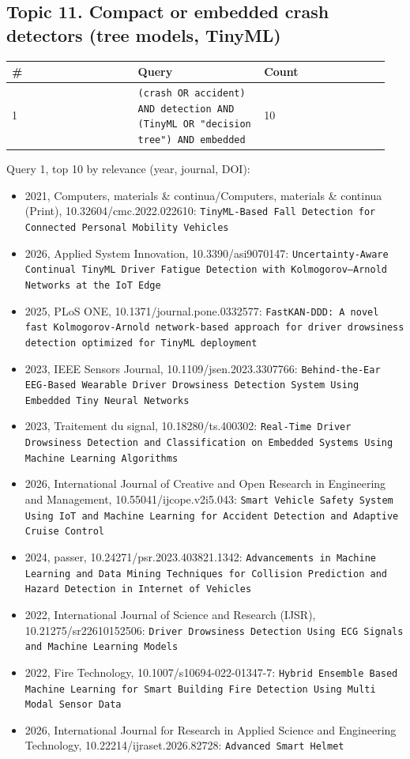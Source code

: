 \subsection*{Topic 11. Compact or embedded crash detectors (tree models, TinyML)}

{\scriptsize\raggedright
\begin{longtable}{p{0.317\linewidth}p{0.317\linewidth}p{0.317\linewidth}}
\toprule
\# & Query & Count \\
\midrule
\endhead
1 & \texttt{(crash OR accident) AND detection AND (TinyML OR "decision tree") AND embedded} & 10 \\
\bottomrule
\end{longtable}}

Query 1, top 10 by relevance (year, journal, DOI):

\begin{itemize}
\item 2021, Computers, materials \& continua/Computers, materials \& continua (Print), 10.32604/cmc.2022.022610: \texttt{TinyML-Based Fall Detection for Connected Personal Mobility Vehicles}
\item 2026, Applied System Innovation, 10.3390/asi9070147: \texttt{Uncertainty-Aware Continual TinyML Driver Fatigue Detection with Kolmogorov--Arnold Networks at the IoT Edge}
\item 2025, PLoS ONE, 10.1371/journal.pone.0332577: \texttt{FastKAN-DDD: A novel fast Kolmogorov-Arnold network-based approach for driver drowsiness detection optimized for TinyML deployment}
\item 2023, IEEE Sensors Journal, 10.1109/jsen.2023.3307766: \texttt{Behind-the-Ear EEG-Based Wearable Driver Drowsiness Detection System Using Embedded Tiny Neural Networks}
\item 2023, Traitement du signal, 10.18280/ts.400302: \texttt{Real-Time Driver Drowsiness Detection and Classification on Embedded Systems Using Machine Learning Algorithms}
\item 2026, International Journal of Creative and Open Research in Engineering and Management, 10.55041/ijcope.v2i5.043: \texttt{Smart Vehicle Safety System Using IoT and Machine Learning for Accident Detection and Adaptive Cruise Control}
\item 2024, passer, 10.24271/psr.2023.403821.1342: \texttt{Advancements in Machine Learning and Data Mining Techniques for Collision Prediction and Hazard Detection in Internet of Vehicles}
\item 2022, International Journal of Science and Research (IJSR), 10.21275/sr22610152506: \texttt{Driver Drowsiness Detection Using ECG Signals and Machine Learning Models}
\item 2022, Fire Technology, 10.1007/s10694-022-01347-7: \texttt{Hybrid Ensemble Based Machine Learning for Smart Building Fire Detection Using Multi Modal Sensor Data}
\item 2026, International Journal for Research in Applied Science and Engineering Technology, 10.22214/ijraset.2026.82728: \texttt{Advanced Smart Helmet}
\end{itemize}

